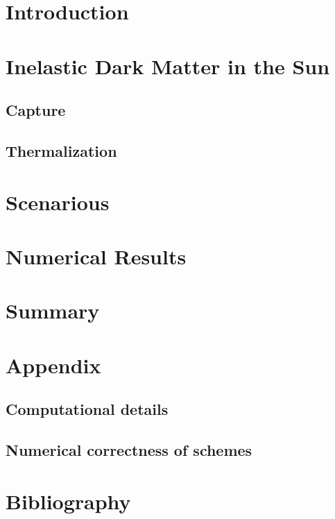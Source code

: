 


	
	\tableofcontents
	\section{Introduction}
	
	
	\section{Inelastic Dark Matter in the Sun}
	
	\subsection{Capture}
	
	\subsection{Thermalization}
	
	
	\section{Scenarious}
	
	
	
	
	\section{Numerical Results}
	
	
	\section{Summary}
	
	\section{Appendix}
	\subsection{Computational details}
	
	\subsection{Numerical correctness of schemes}
	
	
	\section{Bibliography}
	
	
	
	
